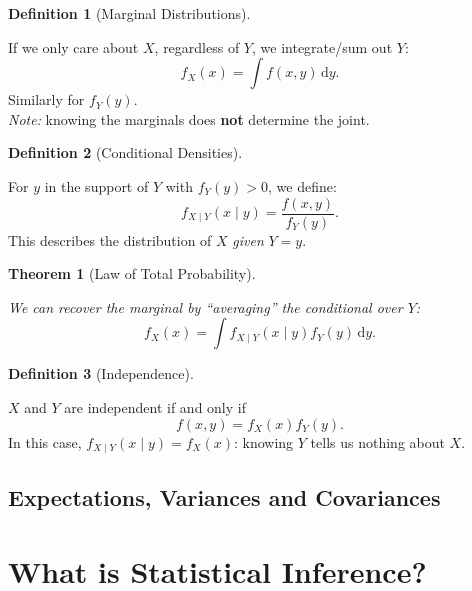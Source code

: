 \documentclass[
  letterpaper,
  DIV=11,
  numbers=noendperiod]{scrreprt}
\theoremstyle{definition}
\theoremstyle{plain}
\newtheorem{theorem}{Theorem}[chapter]
\theoremstyle{definition}
\newtheorem{definition}{Definition}[chapter]
\theoremstyle{remark}
\begin{document}
\begin{definition}[Marginal
Distributions]\protect\hypertarget{def-marginal-pdf}{}\label{def-marginal-pdf}

If we only care about \(X\), regardless of \(Y\), we integrate/sum out
\(Y\): \[
f_X(x) = \int f(x,y)\,\mathrm{d}y.
\] Similarly for \(f_Y(y)\).\\
\emph{Note:} knowing the marginals does \textbf{not} determine the
joint.

\end{definition}

\begin{definition}[Conditional
Densities]\protect\hypertarget{def-conditional-pdf}{}\label{def-conditional-pdf}

For \(y\) in the support of \(Y\) with \(f_Y(y) > 0\), we define: \[
f_{X \mid Y}(x \mid y) = \frac{f(x,y)}{f_Y(y)}.
\] This describes the distribution of \(X\) \emph{given} \(Y=y\).

\end{definition}

\begin{theorem}[Law of Total
Probability]\protect\hypertarget{thm-total-probability-pdfs}{}\label{thm-total-probability-pdfs}

We can recover the marginal by ``averaging'' the conditional over \(Y\):
\[
f_X(x) = \int f_{X \mid Y}(x \mid y) f_Y(y)\,\mathrm{d}y.
\]

\end{theorem}

\begin{definition}[Independence]\protect\hypertarget{def-independence-rv}{}\label{def-independence-rv}

\(X\) and \(Y\) are independent if and only if \[
f(x,y) = f_X(x) f_Y(y).
\] In this case, \(f_{X \mid Y}(x \mid y) = f_X(x)\): knowing \(Y\)
tells us nothing about \(X\).

\end{definition}

\section{Expectations, Variances and
Covariances}\label{expectations-variances-and-covariances}

\chapter{What is Statistical
Inference?}\label{what-is-statistical-inference-1}
\end{document}
